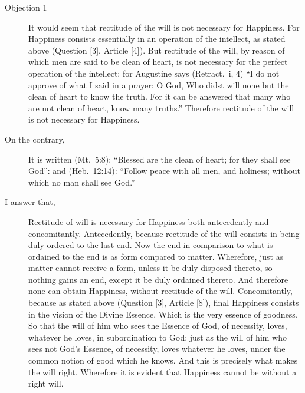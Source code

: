 \documentclass{bookclub}
\begin{document}
\begin{multicols}{2}
	\begin{description}
		\item[Objection 1]%
		It would seem that rectitude of the will is not necessary for Happiness. For Happiness consists essentially in an operation of the intellect,%
		as stated above (Question [3], Article [4]). But rectitude of the will, by reason of which men are said to be clean of heart, is not necessary for the perfect operation of the intellect: for Augustine says (Retract.~i, 4) ``I do not approve of what I said in a prayer: O God, Who didst will none but the clean of heart to know the truth. For it can be answered that many who are not clean of heart, know many truths.'' Therefore rectitude of the will is not necessary for Happiness.
		\item[On the contrary,] It is written (Mt.~5:8): ``Blessed are the clean of heart; for they shall see God'': and (Heb.~12:14): ``Follow peace with all men, and holiness; without which no man shall see God.''
		\item[I answer that,] Rectitude of will is necessary for Happiness both antecedently and concomitantly. Antecedently, because rectitude of the will consists in being duly ordered to the last end. Now the end in comparison to what is ordained to the end is as form compared to matter. Wherefore, just as matter cannot receive a form, unless it be duly disposed thereto, so nothing gains an end, except it be duly ordained thereto. And therefore none can obtain Happiness, without rectitude of the will. Concomitantly, because as stated above (Question [3], Article [8]), final Happiness consists in the vision of the Divine Essence, Which is the very essence of goodness. So that the will of him who sees the Essence of God, of necessity, loves, whatever he loves, in subordination to God; just as the will of him who sees not God's Essence, of necessity, loves whatever he loves, under the common notion of good which he knows. And this is precisely what makes the will right. Wherefore it is evident that Happiness cannot be without a right will.
	\end{description}
	

\end{multicols}
\end{document}
